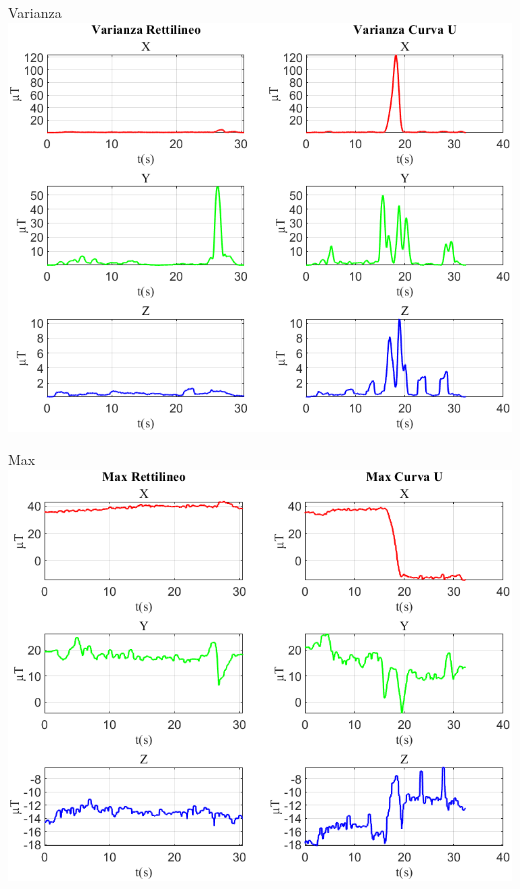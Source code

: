 \documentclass[beamer]{standalone}
\begin{document}
	
	\begin{frame}{{Varianza}}
		\centering\includegraphics[height=.8\textheight]{figure/Mag/Varianza}
	\end{frame}
	
%	
	
	\begin{frame}{{Max}}
		\centering\includegraphics[height=.8\textheight]{figure/Mag/Max}
	\end{frame}
	
\end{document}
